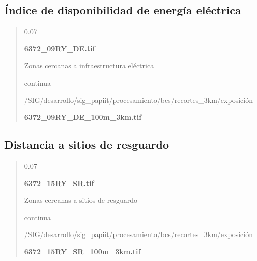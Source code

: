 \documentclass[letterpaper,10pt,spanish]{sphinxmanual}
\begin{document}
\subsection{Índice de disponibilidad de energía eléctrica}
\label{\detokenize{exposicion_bcs:indice-de-disponibilidad-de-energia-electrica}}
\begin{quote}

 0.07

 {\color{red}\bfseries{}\textbar{}6372\_09RY\_DE.tif\textbar{}}

 Zonas cercanas a infraestructura eléctrica

 continua


 /SIG/desarrollo/sig\_papiit/procesamiento/bcs/recortes\_3km/exposición

  {\color{red}\bfseries{}\textbar{}6372\_09RY\_DE\_100m\_3km.tif\textbar{}}
\begin{quote}

\end{quote}
\end{quote}


\subsection{Distancia a sitios de resguardo}
\label{\detokenize{exposicion_bcs:distancia-a-sitios-de-resguardo}}
\begin{quote}

 0.07

 {\color{red}\bfseries{}\textbar{}6372\_15RY\_SR.tif\textbar{}}

 Zonas cercanas a sitios de resguardo

 continua


 /SIG/desarrollo/sig\_papiit/procesamiento/bcs/recortes\_3km/exposición

  {\color{red}\bfseries{}\textbar{}6372\_15RY\_SR\_100m\_3km.tif\textbar{}}
\begin{quote}

\end{quote}
\end{quote}
\end{document}
